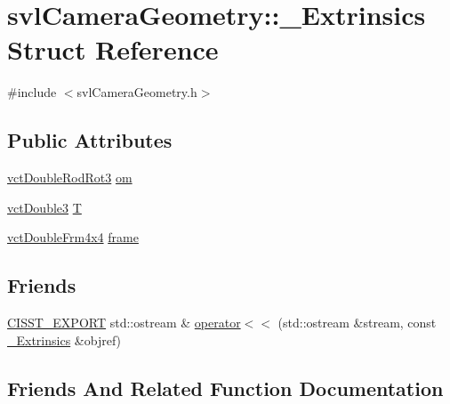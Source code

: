 \hypertarget{structsvl_camera_geometry_1_1___extrinsics}{}\section{svl\+Camera\+Geometry\+:\+:\+\_\+\+Extrinsics Struct Reference}
\label{structsvl_camera_geometry_1_1___extrinsics}


{\ttfamily \#include $<$svl\+Camera\+Geometry.\+h$>$}

\subsection*{Public Attributes}
\begin{DoxyCompactItemize}
\item 
\hyperlink{vct_transformation_types_8h_a350d1047878839beb9dd36107516bd75}{vct\+Double\+Rod\+Rot3} \hyperlink{structsvl_camera_geometry_1_1___extrinsics_afeaca93a0c8c4b674c81a785b3aeda35}{om}
\item 
\hyperlink{vct_fixed_size_vector_types_8h_a4a89122c9d7f72c3f31fe8126e17c3af}{vct\+Double3} \hyperlink{structsvl_camera_geometry_1_1___extrinsics_aa41edbc90833a086ff1fff5c11fa7eb8}{T}
\item 
\hyperlink{vct_transformation_types_8h_ac7626dd8caf0095c4a1b427918c0f3b8}{vct\+Double\+Frm4x4} \hyperlink{structsvl_camera_geometry_1_1___extrinsics_a5cfad30329c5074e76e57eaf85b4737f}{frame}
\end{DoxyCompactItemize}
\subsection*{Friends}
\begin{DoxyCompactItemize}
\item 
\hyperlink{cmn_export_macros_8h_a99393e0c3ac434b2605235bbe20684f8}{C\+I\+S\+S\+T\+\_\+\+E\+X\+P\+O\+R\+T} std\+::ostream \& \hyperlink{structsvl_camera_geometry_1_1___extrinsics_a642ead17aecfba14ae8680b67ffedfca}{operator$<$$<$} (std\+::ostream \&stream, const \hyperlink{structsvl_camera_geometry_1_1___extrinsics}{\+\_\+\+Extrinsics} \&objref)
\end{DoxyCompactItemize}


\subsection{Friends And Related Function Documentation}
\hypertarget{structsvl_camera_geometry_1_1___extrinsics_a642ead17aecfba14ae8680b67ffedfca}{}
